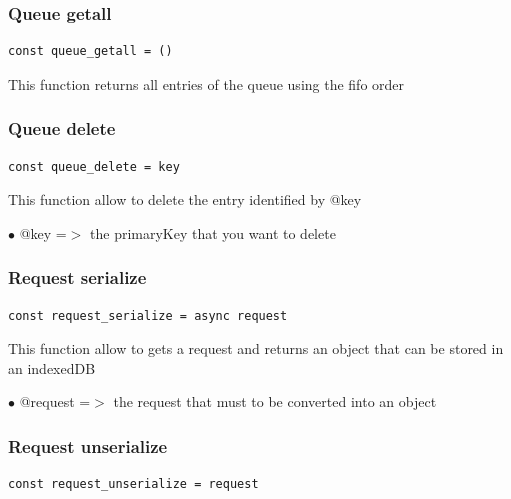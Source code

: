 \documentclass[a4paper]{article}
\begin{document}
\subsubsection{Queue getall}

\begin{lstlisting}
const queue_getall = ()
\end{lstlisting}

This function returns all entries of the queue using the fifo
order

\hypertarget{toc268}{}
\subsubsection{Queue delete}

\begin{lstlisting}
const queue_delete = key
\end{lstlisting}

This function allow to delete the entry identified by @key

\begin{compactitem}
\item[\color{myblue}$\bullet$] @key =$>$ the primaryKey that you want to delete
\end{compactitem}

\hypertarget{toc269}{}
\subsubsection{Request serialize}

\begin{lstlisting}
const request_serialize = async request
\end{lstlisting}

This function allow to gets a request and returns an object
that can be stored in an indexedDB

\begin{compactitem}
\item[\color{myblue}$\bullet$] @request =$>$ the request that must to be converted into an object
\end{compactitem}

\hypertarget{toc270}{}
\subsubsection{Request unserialize}

\begin{lstlisting}
const request_unserialize = request
\end{lstlisting}
\end{document}
